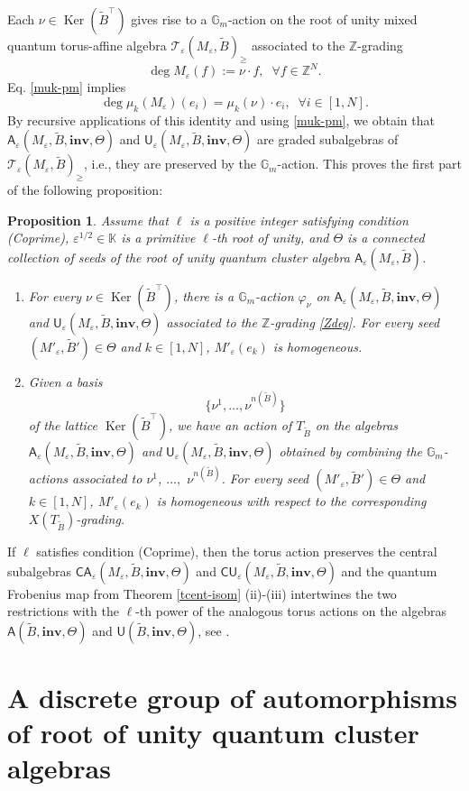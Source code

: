 \documentclass[11pt]{amsart}
\theoremstyle{plain}
\newcommand{\cleqn}{\setcounter{equation}{0}}
\newcommand{\clth}{\setcounter{theorem}{0}}
\newcommand {\sectionnew}[1]{\section{#1}\cleqn\clth}
\newtheorem{proposition}[theorem]{Proposition}
\newcommand \bpr[1] { \begin{proposition}\label{p#1} }
\newcommand {\epr} { \end{proposition} }
\newcommand \thref[1]{Theorem \ref{t#1}}
\def \KK {{\mathbb C}}
\def \KK {{\mathbb K}}
\def \Gset {{\mathbb G}}
\def \Zset {{\mathbb Z}}
\def \A {{\boldsymbol{\mathsf A}}}
\def \C {{\boldsymbol{\mathsf C}}}
\def \U {{\boldsymbol{\mathsf U}}}
\def \B  {{\widetilde{B}}}
\newcommand \inv {{\mathbf{inv}}}
\def \TT {{\mathcal{T}}}
\def \ep {\varepsilon}
\DeclareMathOperator \Ker { {\mathrm{Ker}} }
\begin{document}
Each $\nu \in  \Ker(\B^\top)$ gives rise to a $\Gset_m$-action on the root of unity mixed quantum torus-affine algebra $\TT_\ep(M_\ep, \B)_\geq$ associated to the $\Zset$-grading  
\begin{equation}
\label{Zdeg}
\deg M_\ep(f):= \nu \cdot f, \; \; \forall f \in \Zset^N.
\end{equation}
Eq. \eqref{muk-pm} implies
\[
\deg \mu_k(M_\ep)(e_i) = \mu_k(\nu) \cdot e_i, \; \; \forall i \in [1,N].
\]
By recursive applications of this identity and using \eqref{muk-pm}, 
we obtain that $\A_\ep(M_\ep, \B, \inv, \Theta)$ and $\U_\ep(M_\ep, \B, \inv, \Theta)$
are graded subalgebras of $\TT_\ep(M_\ep, \B)_\geq$, i.e., they are preserved by the $\Gset_m$-action. 
This proves the first part of the following proposition:

\bpr{Caction} \cite[Sect. 3.3]{MNTY} Assume that $\ell$ is a positive integer satisfying condition (Coprime), $\ep^{1/2} \in \KK$ is a primitive $\ell$-th root of unity, and $\Theta$ is a connected collection of seeds of the root of unity quantum cluster algebra $\A_\ep(M_\ep, \B)$. 
\hfill
\begin{enumerate}
\item[(i)]
For every $\nu \in \Ker(\B^\top)$, there is a $\Gset_m$-action 
$\varphi_\nu$ on $\A_\ep(M_\ep, \B, \inv, \Theta)$ and $\U_\ep(M_\ep, \B, \inv, \Theta)$ 
associated to the $\Zset$-grading \eqref{Zdeg}. 
For every seed $(M'_\ep, \B') \in \Theta$ and $k \in [1,N]$, $M'_\ep(e_k)$ is homogeneous. 
\item[(ii)] Given a basis 
\[
\{\nu^1, \dots, \nu^{n(\B)} \}
\]
of the lattice $\Ker(\B^\top)$, 
we have an action of $T_{\B}$ on the algebras $\A_\ep(M_\ep, \B, \inv, \Theta)$ and
$\U_\ep(M_\ep, \B, \inv, \Theta)$ obtained by combining the $\Gset_m$-actions associated to $\nu^1$, $\dots,$ $\nu^{n(\B)}$. 
For every seed $(M'_\ep, \B') \in \Theta$ and $k \in [1,N]$, $M'_\ep(e_k)$ is homogeneous 
with respect to the corresponding $X(T_{\B})$-grading. 
\end{enumerate}
\epr

If $\ell$ satisfies condition (Coprime), then the torus action preserves the central subalgebras $\C\A_\ep(M_\ep, \B, \inv, \Theta)$ and $\C\U_\ep(M_\ep, \B, \inv, \Theta)$ and the quantum Frobenius map from \thref{cent-isom} (ii)-(iii) intertwines the two restrictions with the $\ell$-th power of the analogous torus actions on the algebras 
$\A(\B, \inv, \Theta)$ and $\U(\B, \inv, \Theta)$, see 
\cite[Lemma 3.4(ii)]{MNTY}.

\sectionnew{A discrete group of automorphisms of root of unity quantum cluster algebras}
\end{document}
